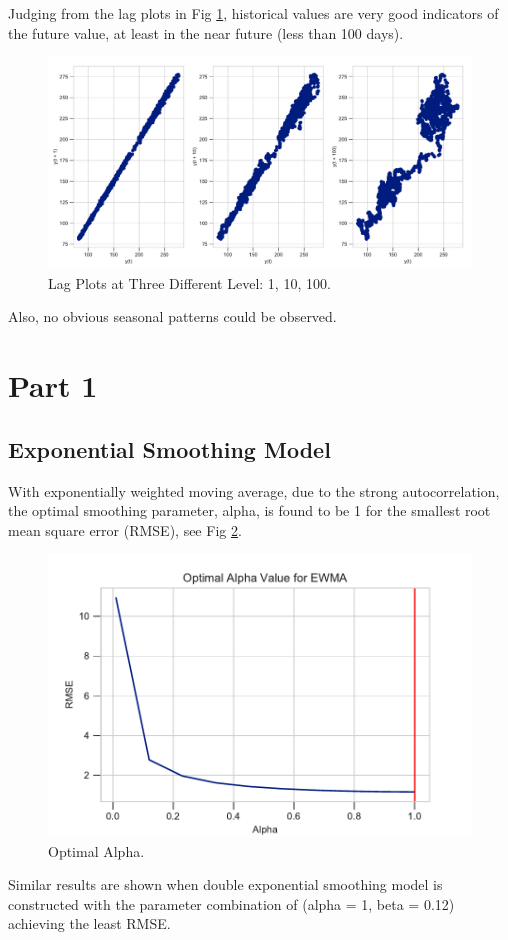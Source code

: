 \documentclass[]{article}
\begin{document}
%
Judging from the lag plots in Fig \ref{fig:three_lag_plots}, historical values are very good indicators of the future value, at least in the near future (less than 100 days). 
%
\begin{figure}[ht]
	\centering
	\includegraphics[width=.8\columnwidth]{../Figures/three_lag_plots.pdf}
	\caption{Lag Plots at Three Different Level: 1, 10, 100.}
	\label{fig:three_lag_plots}
\end{figure}
%
Also, no obvious seasonal patterns could be observed. 


\section{Part 1}
\subsection{Exponential Smoothing Model}
With exponentially weighted moving average, due to the strong autocorrelation, the optimal smoothing parameter, alpha, is found to be 1 for the smallest root mean square error (RMSE), see Fig \ref{fig:optimal_alpha_ewma}.
%
\begin{figure}[ht]
	\centering
	\includegraphics[width=1\columnwidth]{../Figures/optimal_alpha_ewma.pdf}
	\caption{Optimal Alpha.}
	\label{fig:optimal_alpha_ewma}
\end{figure}
%
Similar results are shown when double exponential smoothing model is constructed with the parameter combination of (alpha = 1, beta = 0.12) achieving the least RMSE. 
\end{document}
